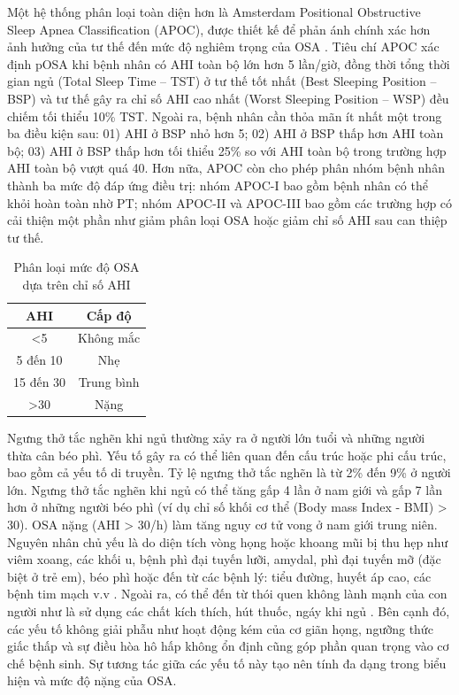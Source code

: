Một hệ thống phân loại toàn diện hơn là Amsterdam Positional Obstructive Sleep Apnea Classification (APOC), 
được thiết kế để phản ánh chính xác hơn ảnh hưởng của tư thế đến mức độ nghiêm trọng của OSA \cite{frank2014positional}. 
Tiêu chí APOC xác định pOSA khi bệnh nhân có AHI toàn bộ lớn hơn 5 lần/giờ, 
đồng thời tổng thời gian ngủ (Total Sleep Time – TST) ở tư thế tốt nhất (Best Sleeping Position – BSP) và tư thế gây ra chỉ số AHI cao nhất 
(Worst Sleeping Position – WSP) đều chiếm tối thiểu 10\% TST. 
Ngoài ra, bệnh nhân cần thỏa mãn ít nhất một trong ba điều kiện sau: 
01) AHI ở BSP nhỏ hơn 5; 02) AHI ở BSP thấp hơn AHI toàn bộ; 
03) AHI ở BSP thấp hơn tối thiểu 25\% so với AHI toàn bộ trong trường 
hợp AHI toàn bộ vượt quá 40. Hơn nữa, APOC còn cho phép phân nhóm bệnh nhân thành 
ba mức độ đáp ứng điều trị: nhóm APOC-I bao gồm bệnh nhân có thể khỏi hoàn toàn nhờ PT; 
nhóm APOC-II và APOC-III bao gồm các trường hợp có cải thiện một phần như giảm phân loại OSA 
hoặc giảm chỉ số AHI sau can thiệp tư thế.

\begin{table}[h!]
\caption{\texorpdfstring{Phân loại mức độ OSA dựa trên chỉ số AHI}{Phân loại OSA}}
\label{ahi}
\vspace{-3mm}
\begin{center}
\begin{tabular}{|c|c|}
\hline
AHI & Cấp độ \\
\hline
<5 & Không mắc \\
5 đến 10 & Nhẹ \\
15 đến 30 & Trung bình \\
>30 & Nặng \\
\hline
\end{tabular}
\label{tab1}
\end{center}
\end{table}



Ngưng thở tắc nghẽn khi ngủ thường xảy ra ở người lớn tuổi và những người thừa cân béo phì. 
Yếu tố gây ra có thể liên quan đến cấu trúc hoặc phi cấu trúc, bao gồm cả yếu tố di truyền. 
Tỷ lệ ngưng thở tắc nghẽn là từ 2\% đến 9\% ở người lớn. 
Ngưng thở tắc nghẽn khi ngủ có thể tăng gấp 4 lần ở nam giới và gấp 7 lần hơn ở những người béo phì (ví dụ chỉ số khối cơ thể (Body mass Index - BMI) > 30). 
OSA nặng (AHI > 30/h) làm tăng nguy cơ tử vong ở nam giới trung niên.
Nguyên nhân chủ yếu là do diện tích vòng họng hoặc khoang mũi bị thu hẹp như viêm xoang, 
các khối u, bệnh phì đại tuyến lưỡi, amydal, phì đại tuyến mỡ (đặc biệt ở trẻ em), 
béo phì hoặc đến từ các bệnh lý: tiểu đường, huyết áp cao, các bệnh tim mạch v.v \cite{wright1997health}. 
Ngoài ra, có thể đến từ thói quen không lành mạnh của con người như là sử dụng các chất kích thích, hút thuốc, ngáy khi ngủ \cite{reason_osa}\cite{reasonOsa}. 
Bên cạnh đó, các yếu tố không giải phẫu như hoạt động kém của cơ giãn họng, ngưỡng thức giấc thấp và sự điều hòa hô hấp không ổn định cũng góp phần quan trọng vào cơ chế bệnh sinh. 
Sự tương tác giữa các yếu tố này tạo nên tính đa dạng trong biểu hiện và mức độ nặng của OSA.



